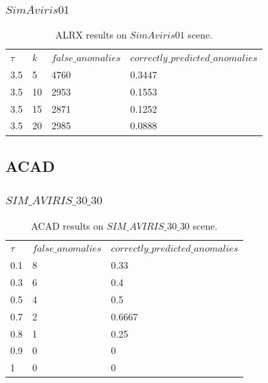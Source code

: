 \subsubsection{$SimAviris01$}

 \begin{table}[H]
\centering
 \resizebox{1.1\textwidth}{!}
{\begin{tabular}{l|l|l|l}
\textbf{$\tau$} &\textbf{$k$} & $false\_anomalies$ & $correctly\_predicted\_anomalies$\\
3.5&5 &4760 & 0.3447 \\
3.5&10 &2953 &0.1553 \\
3.5&15 &2871 &0.1252 \\
3.5&20 & 2985&0.0888 \\

\end{tabular}}
\caption{ALRX results on $SimAviris01$ scene.}
\label{tab:ALRX_simAviris01}
\end{table}


\subsection{ACAD}
\subsubsection{$SIM\_AVIRIS\_30\_30$}
 \begin{table}[H]
\centering
 \resizebox{1.1\textwidth}{!}
{\begin{tabular}{l|l|l}
\textbf{$\tau$}  & $false\_anomalies$ & $correctly\_predicted\_anomalies$\\
0.1& 8& 0.33 \\
0.3 &6 &0.4 \\
0.5& 4&0.5 \\
0.7& 2&0.6667 \\
0.8&1&0.25\\
0.9 &0 &0\\
1 & 0&0 \\

\end{tabular}}
\caption{ACAD results on $SIM\_AVIRIS\_30\_30$ scene.}
\label{tab:ACAD_simAviris30_30}
\end{table}

